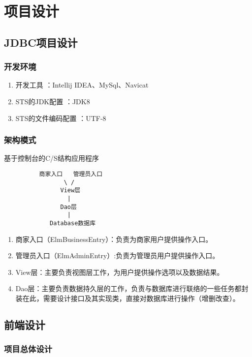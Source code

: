 


\chapter{项目设计}

\section{JDBC项目设计}
\subsection{开发环境}
\begin{enumerate}
    \item {开发工具} ：Intellij IDEA、MySql、Navicat
    \item {STS的JDK配置} ：JDK8
    \item {STS的文件编码配置} ：UTF-8
\end{enumerate}


\subsection{架构模式}
基于控制台的C/S结构应用程序
\begin{verbatim}
          商家入口   管理员入口
                 \ /     
                View层
                  |
                Dao层
                  |
             Database数据库
\end{verbatim}

\begin{enumerate}
    \item 商家入口（ElmBusinessEntry）：负责为商家用户提供操作入口。
    \item 管理员入口（ElmAdminEntry）:负责为管理员用户提供操作入口。
    \item View层：主要负责视图层工作，为用户提供操作选项以及数据结果。
    \item Dao层：主要负责数据持久层的工作，负责与数据库进行联络的一些任务都封装在此，需要设计接口及其实现类，直接对数据库进行操作（增删改查）。
\end{enumerate}

\section{前端设计}

\subsection{项目总体设计} 


